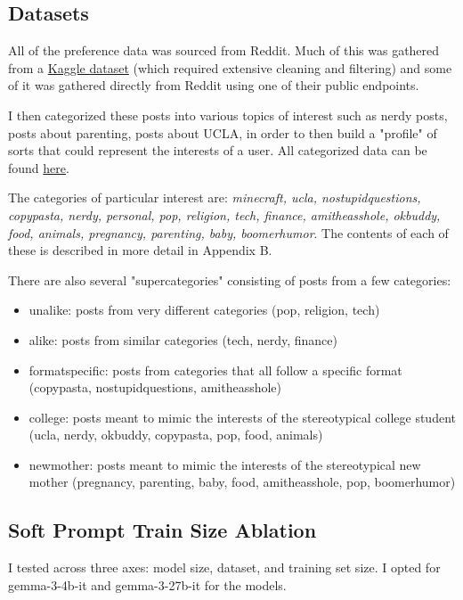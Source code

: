 \documentclass[11pt]{article}
\begin{document}
\subsection{Datasets}

All of the preference data was sourced from Reddit. Much of this was gathered from a \href{https://www.kaggle.com/datasets/noahpersaud/reddit-submissions-dec-2022-to-feb-2023}{Kaggle dataset} (which required extensive cleaning and filtering) and some of it was gathered directly from Reddit using one of their public endpoints. 

I then categorized these posts into various topics of interest such as nerdy posts, posts about parenting, posts about UCLA, in order to then build a "profile" of sorts that could represent the interests of a user. All categorized data can be found \href{https://github.com/EinarBalan/slop/tree/main/datasets}{here}.

The categories of particular interest are: \emph{minecraft, ucla, nostupidquestions, copypasta, nerdy, personal, pop, religion, tech, finance, amitheasshole, okbuddy, food, animals, pregnancy, parenting, baby, boomerhumor}. The contents of each of these is described in more detail in Appendix B.

There are also several "supercategories" consisting of posts from a few categories:
\begin{itemize}
    \item unalike: posts from very different categories (pop, religion, tech)
    \item alike: posts from similar categories (tech, nerdy, finance)
    \item formatspecific: posts from categories that all follow a specific format (copypasta, nostupidquestions, amitheasshole)
    \item college: posts meant to mimic the interests of the stereotypical college student (ucla, nerdy, okbuddy, copypasta, pop, food, animals)
    \item newmother: posts meant to mimic the interests of the stereotypical new mother (pregnancy, parenting, baby, food, amitheasshole, pop, boomerhumor)
\end{itemize}

\subsection{Soft Prompt Train Size Ablation}

I tested across three axes: model size, dataset, and training set size. I opted for gemma-3-4b-it and gemma-3-27b-it for the models.
\end{document}
